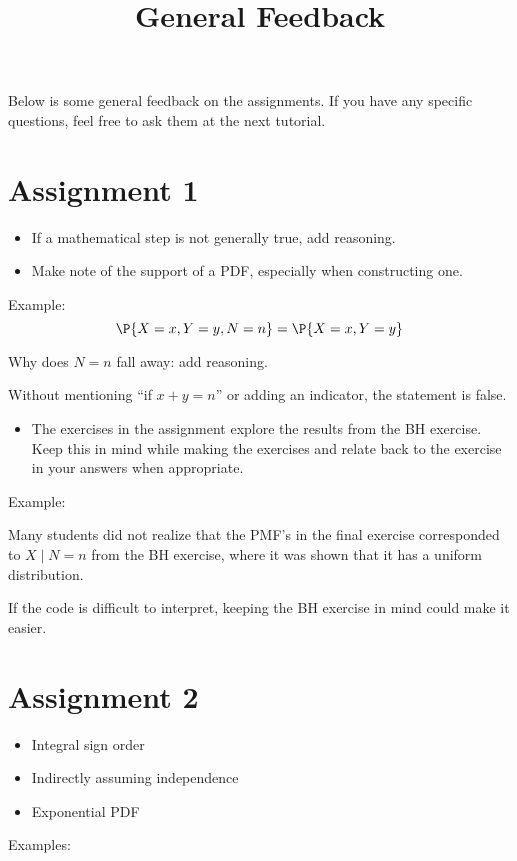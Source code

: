 


\title{General Feedback}


\maketitle
Below is some general feedback on the assignments. If you have any
specific questions, feel free to ask them at the next tutorial.

\section*{Assignment 1}

\begin{itemize}
\item If a mathematical step is not generally true, add reasoning.
\item Make note of the support of a PDF, especially when constructing one.
\end{itemize}

Example:
$$\P{X=x, Y=y, N=n} = \P{X=x, Y=y}$$

Why does $N=n$ fall away: add reasoning.

Without mentioning ``if $x+y=n$'' or adding an indicator, the
statement is false.

\begin{itemize}
\item The exercises in the assignment explore the results from the BH
exercise. Keep this in mind while making the exercises and relate
back to the exercise in your answers when appropriate.
\end{itemize}

Example:

Many students did not realize that the PMF's in the final exercise
corresponded to $X\mid N=n$ from the BH exercise, where it was shown
that it has a uniform distribution.

If the code is difficult to interpret, keeping the BH exercise in
mind could make it easier.

\section*{Assignment 2}
\begin{itemize}
\item Integral sign order
\item Indirectly assuming independence
\item Exponential PDF
\end{itemize}
Examples:

